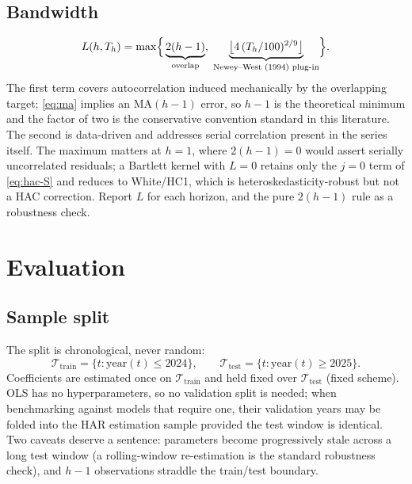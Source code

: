\documentclass[11pt,a4paper]{article}
\begin{document}
\subsection{Bandwidth}

\begin{equation}
  L(h,T_h)=\max\Bigl\{\,\underbrace{2(h-1)}_{\text{overlap}},\;
  \underbrace{\bigl\lfloor 4\,(T_h/100)^{2/9}\bigr\rfloor}_{\text{Newey--West (1994) plug-in}}\Bigr\}.
  \label{eq:bandwidth}
\end{equation}
The first term covers autocorrelation induced mechanically by the overlapping target;
\eqref{eq:ma} implies an $\mathrm{MA}(h-1)$ error, so $h-1$ is the theoretical minimum and
the factor of two is the conservative convention standard in this literature. The second is
data-driven and addresses serial correlation present in the series itself. The maximum
matters at $h=1$, where $2(h-1)=0$ would assert serially uncorrelated residuals; a Bartlett
kernel with $L=0$ retains only the $j=0$ term of \eqref{eq:hac-S} and reduces to White/HC1,
which is heteroskedasticity-robust but not a HAC correction. Report $L$ for each horizon,
and the pure $2(h-1)$ rule as a robustness check.

\section{Evaluation}
\label{sec:evaluation}

\subsection{Sample split}

The split is chronological, never random:
\begin{equation}
  \mathcal{T}_{\text{train}}=\{t:\text{year}(t)\le 2024\},\qquad
  \mathcal{T}_{\text{test}}=\{t:\text{year}(t)\ge 2025\}.
  \label{eq:split}
\end{equation}
Coefficients are estimated once on $\mathcal{T}_{\text{train}}$ and held fixed over
$\mathcal{T}_{\text{test}}$ (fixed scheme). OLS has no hyperparameters, so no validation
split is needed; when benchmarking against models that require one, their validation years
may be folded into the HAR estimation sample provided the test window is identical. Two
caveats deserve a sentence: parameters become progressively stale across a long test window
(a rolling-window re-estimation is the standard robustness check), and $h-1$ observations
straddle the train/test boundary.
\end{document}

